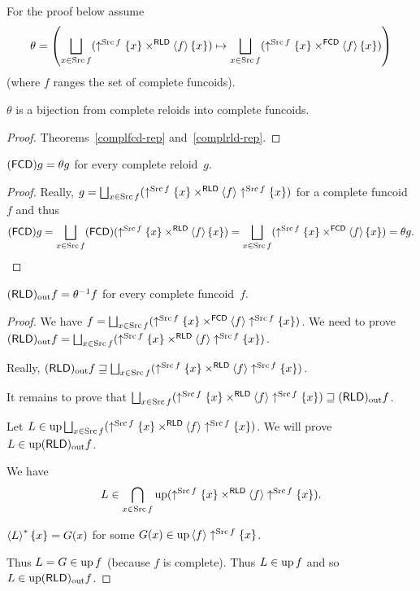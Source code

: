 For the proof below assume 
\[
\theta=\left(\bigsqcup_{x\in\operatorname{Src} f}(\uparrow^{\operatorname{Src} f}\{x\}\times^{\mathsf{RLD}}\left\langle f\right\rangle\{x\})\mapsto\bigsqcup_{x\in\operatorname{Src} f}(\uparrow^{\operatorname{Src} f}\{x\}\times^{\mathsf{FCD}}\left\langle f\right\rangle\{x\})\right)
\]
 (where $f$ ranges the set of complete funcoids).
\begin{lem}
$\theta$ is a bijection from complete reloids into complete funcoids.\end{lem}
\begin{proof}
Theorems~\ref{complfcd-rep} and~\ref{complrld-rep}.\end{proof}
\begin{lem}
$(\mathsf{FCD}) g=\theta g$ for every complete reloid~$g$.\end{lem}
\begin{proof}
Really, $g=\bigsqcup_{x\in\operatorname{Src} f}(\uparrow^{\operatorname{Src} f}\{x\}\times^{\mathsf{RLD}}\left\langle f\right\rangle\uparrow^{\operatorname{Src} f}\{x\})$
for a complete funcoid~$f$ and thus 
\[
(\mathsf{FCD}) g=\bigsqcup_{x\in\operatorname{Src} f}(\mathsf{FCD})(\uparrow^{\operatorname{Src} f}\{x\}\times^{\mathsf{RLD}}\left\langle f\right\rangle\{x\})=\bigsqcup_{x\in\operatorname{Src} f}(\uparrow^{\operatorname{Src} f}\{x\}\times^{\mathsf{FCD}}\left\langle f\right\rangle\{x\})=\theta g.
\]
\end{proof}
\begin{lem}
$(\mathsf{RLD})_{\mathrm{out}} f=\theta^{-1}f$ for every complete funcoid~$f$.\end{lem}
\begin{proof}
We have $f=\bigsqcup_{x\in\operatorname{Src} f}(\uparrow^{\operatorname{Src} f}\{x\}\times^{\mathsf{FCD}}\left\langle f\right\rangle\uparrow^{\operatorname{Src} f}\{x\})$.
We need to prove $(\mathsf{RLD})_{\mathrm{out}} f=\bigsqcup_{x\in\operatorname{Src} f}(\uparrow^{\operatorname{Src} f}\{x\}\times^{\mathsf{RLD}}\left\langle f\right\rangle\uparrow^{\operatorname{Src} f}\{x\})$.

Really, $(\mathsf{RLD})_{\mathrm{out}} f\sqsupseteq\bigsqcup_{x\in\operatorname{Src} f}(\uparrow^{\operatorname{Src} f}\{x\}\times^{\mathsf{RLD}}\left\langle f\right\rangle\uparrow^{\operatorname{Src} f}\{x\})$.

It remains to prove that $\bigsqcup_{x\in\operatorname{Src} f}(\uparrow^{\operatorname{Src} f}\{x\}\times^{\mathsf{RLD}}\left\langle f\right\rangle\uparrow^{\operatorname{Src} f}\{x\})\sqsupseteq(\mathsf{RLD})_{\mathrm{out}} f$.

Let $L\in\operatorname{up}\bigsqcup_{x\in\operatorname{Src} f}(\uparrow^{\operatorname{Src} f}\{x\}\times^{\mathsf{RLD}}\left\langle f\right\rangle\uparrow^{\operatorname{Src} f}\{x\})$.
We will prove $L\in\operatorname{up}(\mathsf{RLD})_{\mathrm{out}} f$.

We have 
\[
L\in\bigcap_{x\in\operatorname{Src} f}\operatorname{up}(\uparrow^{\operatorname{Src} f}\{x\}\times^{\mathsf{RLD}}\left\langle f\right\rangle\uparrow^{\operatorname{Src} f}\{x\}).
\]

$\left\langle L\right\rangle ^{\ast}\{x\} = G(x)$ for some $G(x)\in\operatorname{up}\left\langle f\right\rangle\uparrow^{\operatorname{Src} f}\{x\}$.

Thus $L=G\in\operatorname{up} f$ (because $f$ is complete). Thus $L\in\operatorname{up} f$ and so $L\in\operatorname{up}(\mathsf{RLD})_{\mathrm{out}} f$.

\end{proof}

